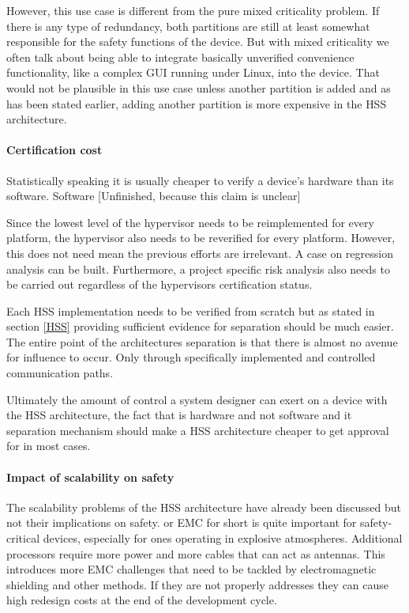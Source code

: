 However, this use case is different from the pure mixed criticality problem. If there is any type of redundancy, both partitions are still at least somewhat responsible for the safety functions of the device. But with mixed criticality we often talk about being able to integrate basically unverified convenience functionality, like a complex GUI running under Linux, into the device. That would not be plausible in this use case unless another partition is added and as has been stated earlier, adding another partition is more expensive in the \gls{HSS} architecture.

\paragraph{Certification cost}
Statistically speaking it is usually cheaper to verify a device's hardware than its software. Software  [Unfinished, because this claim is unclear]

Since the lowest level of the hypervisor needs to be reimplemented for every platform, the hypervisor also needs to be reverified for every platform. However, this does not need mean the previous efforts are irrelevant. A case on regression analysis can be built.
Furthermore, a project specific risk analysis also needs to be carried out regardless of the hypervisors certification status.

Each \gls{HSS} implementation needs to be verified from scratch but as stated in section \ref{HSS} providing sufficient evidence for separation should be much easier. The entire point of the architectures separation is that there is almost no avenue for influence to occur. Only through specifically implemented and controlled communication paths.

Ultimately the amount of control a system designer can exert on a device with the \gls{HSS} architecture, the fact that is hardware and not software and it separation mechanism should make a \gls{HSS} architecture cheaper to get approval for in most cases.


\paragraph{Impact of scalability on safety}
The scalability problems of the \gls{HSS} architecture have already been discussed but not their implications on safety.  or \gls{EMC} for short is quite important for safety-critical devices, especially for ones operating in explosive atmospheres. Additional processors require more power and more cables that can act as antennas. This introduces more \gls{EMC} challenges that need to be tackled by electromagnetic shielding and other methods. If they are not properly addresses they can cause high redesign costs at the end of the development cycle.

